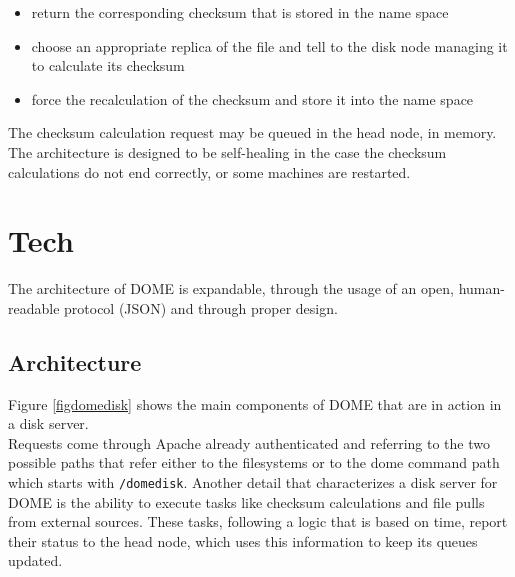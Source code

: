 \documentclass[a4paper,10pt]{scrreprt}
\begin{document}
\begin{itemize}
 \item return the corresponding checksum that is stored in the name space
 \item choose an appropriate replica of the file and tell to the disk node managing it to calculate its checksum
 \item force the recalculation of the checksum and store it into the name space
\end{itemize}

The checksum calculation request may be queued in the head node, in memory. The architecture is designed to be self-healing in the case the checksum
calculations do not end correctly, or some machines are restarted.





\section{Tech}

The architecture of DOME is expandable, through the usage of an open, human-readable protocol (JSON) and through proper design.\\


\subsection{Architecture}
Figure \ref{figdomedisk} shows the main components of DOME that are in action in a disk server.\\
Requests come through Apache already authenticated and referring to the two possible paths that
refer either to the filesystems or to the dome command path which starts with \lstinline{/domedisk}.
Another detail that characterizes a disk server for DOME is the ability to execute tasks like checksum calculations
and file pulls from external sources. These tasks, following a logic that is based on time, report their status
to the head node, which uses this information to keep its queues updated.\\
 
\end{document}
